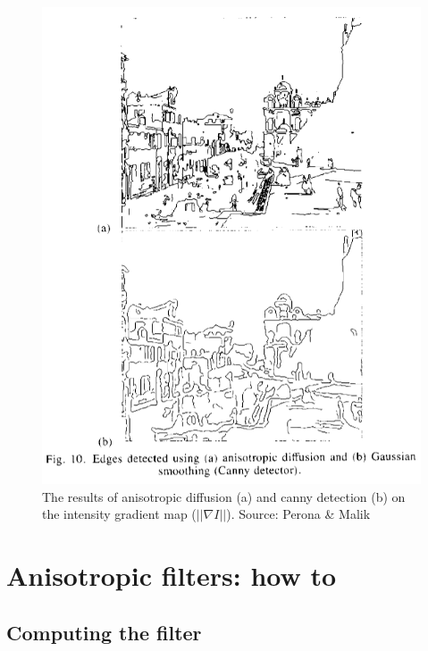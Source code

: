 \documentclass[12pt,a4paper]{article}
\begin{document}
\begin{figure}[h]
	\centering
	\includegraphics[scale=0.5]{EdgeEnhancement_Example.png}
	\caption{The results of anisotropic diffusion (a) and canny detection (b) on the intensity gradient map ($||\nabla I||$). Source: Perona \& Malik}	
\end{figure}

\section{Anisotropic filters: how to}

\subsection{Computing the filter}
\end{document}
